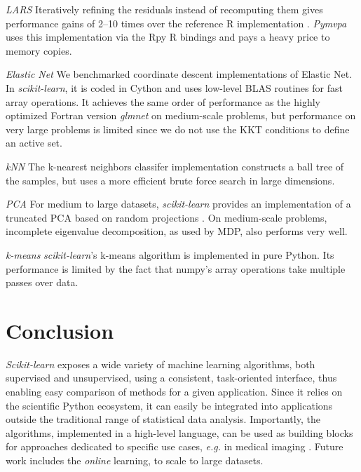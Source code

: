 \documentclass[twoside,11pt]{article}
\begin{document}
\emph{LARS}
%
Iteratively refining the residuals instead of recomputing them gives
performance gains of 2--10 times over the reference R implementation
\citep{LARS}. {\sl Pymvpa} uses this implementation via the Rpy R
bindings and pays a heavy price to memory copies.


\emph{Elastic Net}
%
We benchmarked coordinate descent implementations of Elastic Net.  In
\emph{scikit-learn}, it is coded in Cython and uses low-level BLAS
routines for fast array operations. It achieves the same order of
performance as the highly optimized Fortran version \emph{glmnet}
\citep{friedman2010} on medium-scale problems, but performance on very
large problems is limited since we do not use the KKT conditions to
define an active set.

\emph{kNN}
%
The k-nearest neighbors classifer implementation constructs a ball
tree \citep{omohundro1989} of the samples, but uses a more
efficient brute force search in large dimensions.

\emph{PCA}
%
For medium to large datasets, \emph{scikit-learn} provides an
implementation of a truncated PCA based on random projections
\citep{rokhlin2009}. On medium-scale problems, incomplete eigenvalue
decomposition, as used by MDP, also performs very well.

\emph{k-means}
%
\emph{scikit-learn}'s k-means algorithm is implemented in pure
Python.  Its performance is limited by the fact that numpy's
array operations take multiple passes over data.

\section{Conclusion}

\emph{Scikit-learn} exposes a wide variety of machine learning
algorithms, both supervised and unsupervised, using a consistent,
task-oriented interface, thus enabling easy comparison of methods for a
given application.
%
Since it relies on the scientific Python ecosystem, it can easily be
integrated into applications outside the traditional range of statistical
data analysis. Importantly, the algorithms, implemented in a high-level
language, can be used as building blocks for approaches dedicated to
specific use cases, \emph{e.g.} in medical imaging \citep{Michel2011}.
%
Future work includes the \emph{online} learning, to scale to
large datasets.


\end{document}
